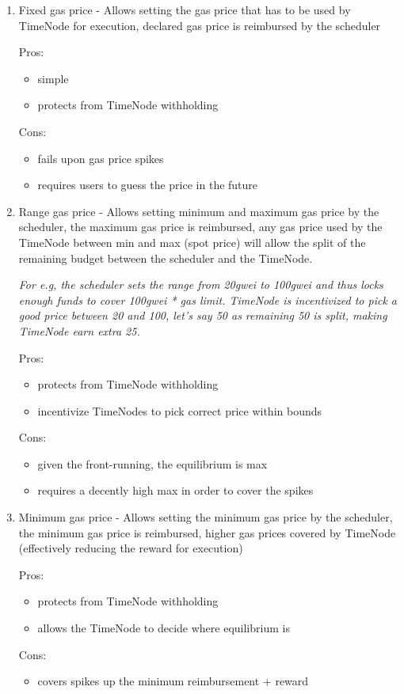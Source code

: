 \documentclass{report}
\begin{document}
  \begin{enumerate}
    \item 
      Fixed gas price - Allows setting the gas price that has to be used by TimeNode for execution, declared gas price is reimbursed by the scheduler
      
      Pros:
      \begin{itemize}
        \item simple
        \item protects from TimeNode withholding 
      \end{itemize}
      Cons:
      \begin{itemize}
        \item fails upon gas price spikes
        \item requires users to guess the price in the future
      \end{itemize}

    \item 
      Range gas price - Allows setting minimum and maximum gas price by the scheduler, the maximum gas price is reimbursed, any gas price used by the TimeNode between min and max (spot price) will allow the split of the remaining budget between the scheduler and the TimeNode.

      \textit{For e.g, the scheduler sets the range from 20gwei to 100gwei and thus locks enough funds to cover 100gwei * gas limit. TimeNode is incentivized to pick a good price between 20 and 100, let’s say 50 as remaining 50 is split, making TimeNode earn extra 25.}

      Pros:
      \begin{itemize}
        \item protects from TimeNode withholding
        \item incentivize TimeNodes to pick correct price within bounds 
      \end{itemize}
      Cons:
      \begin{itemize}
        \item given the front-running, the equilibrium is max
        \item requires a decently high max in order to cover the spikes
      \end{itemize}

    \item 
      Minimum gas price - Allows setting the minimum gas price by the scheduler, the minimum gas price is reimbursed, higher gas prices covered by TimeNode (effectively reducing the reward for execution)

      Pros:
      \begin{itemize}
        \item protects from TimeNode withholding
        \item allows the TimeNode to decide where equilibrium is 
      \end{itemize}
      Cons:
      \begin{itemize}
        \item covers spikes up the minimum reimbursement + reward
      \end{itemize}
  \end{enumerate}
\end{document}
